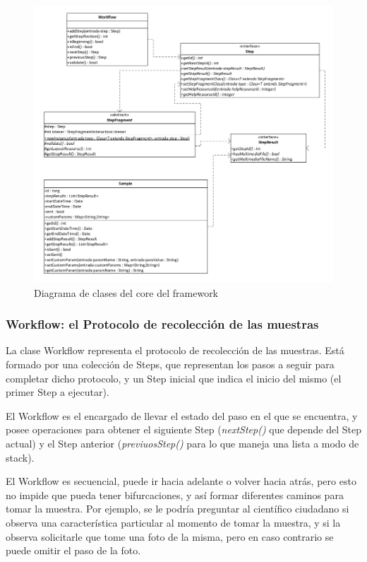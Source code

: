 \begin{figure}[H]
  \centering
    \includegraphics[scale=0.4]{05-implementacion/FrameworkCore.png} 
   \caption{Diagrama de clases del core del framework}
   \label{fig:umlFrameworkCore}
\end{figure}


\subsubsection{Workflow: el Protocolo de recolección de las muestras}
La clase Workflow representa el protocolo de recolección de las muestras. Está formado por una colección de Steps, que representan los pasos a seguir para completar dicho protocolo, y un Step inicial que indica el inicio del mismo (el primer Step a ejecutar).

El Workflow es el encargado de llevar el estado del paso en el que se encuentra, y posee operaciones para obtener el siguiente Step (\textit{nextStep()}  que depende del Step actual) y el Step anterior (\textit{previuosStep()}  para lo que maneja una lista a modo de stack).

El Workflow es secuencial, puede ir hacia adelante o volver hacia atrás, pero esto no impide que pueda tener bifurcaciones, y así formar diferentes caminos para tomar la muestra. Por ejemplo, se le podría preguntar al científico ciudadano si observa una característica particular al momento de tomar la muestra, y si la observa solicitarle que tome una foto de la misma, pero en caso contrario se puede omitir el paso de la foto.

